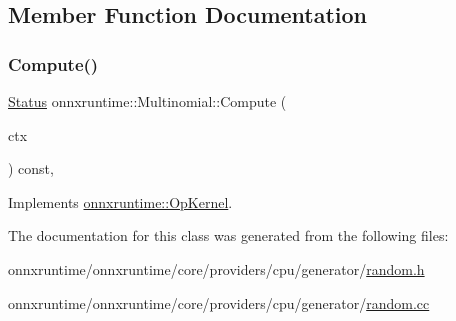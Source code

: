 \subsection{Member Function Documentation}
\mbox{\label{classonnxruntime_1_1Multinomial_a796ae88bddd1fa36e07794f18319155b}} 
\subsubsection{\texorpdfstring{Compute()}{Compute()}}
{\footnotesize\ttfamily \mbox{\hyperlink{classonnxruntime_1_1common_1_1Status}{Status}} onnxruntime\+::\+Multinomial\+::\+Compute (\begin{DoxyParamCaption}\item[{\mbox{\hyperlink{classonnxruntime_1_1OpKernelContext}{Op\+Kernel\+Context}} $\ast$}]{ctx }\end{DoxyParamCaption}) const\hspace{0.3cm}{\ttfamily [override]}, {\ttfamily [virtual]}}



Implements \mbox{\hyperlink{classonnxruntime_1_1OpKernel_a9eca8656a78b1b3ab9d3351a12798650}{onnxruntime\+::\+Op\+Kernel}}.



The documentation for this class was generated from the following files\+:\begin{DoxyCompactItemize}
\item 
onnxruntime/onnxruntime/core/providers/cpu/generator/\mbox{\hyperlink{random_8h}{random.\+h}}\item 
onnxruntime/onnxruntime/core/providers/cpu/generator/\mbox{\hyperlink{random_8cc}{random.\+cc}}\end{DoxyCompactItemize}
